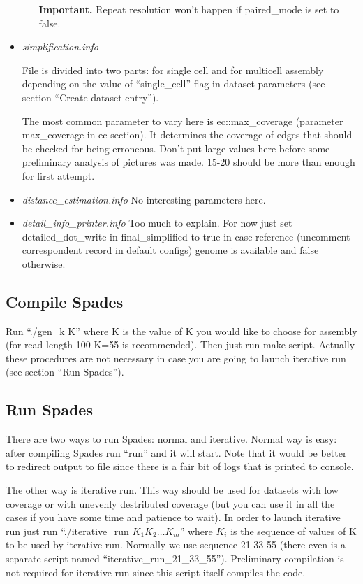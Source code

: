 \documentclass[a4paper,10pt]{article}
\begin{document}
\begin{itemize}
\begin{itemize}
\textbf{Important.} Repeat resolution won't happen if paired\_mode is set to false.
\end{itemize}

\item {\it simplification.info}

File is divided into two parts: for single cell and for multicell assembly depending on the value of ``single\_cell'' flag in dataset parameters (see section ``Create dataset entry'').

The most common parameter to vary here is ec::max\_coverage (parameter max\_coverage in ec section). It determines the coverage of edges that should be checked for being erroneous. Don't put large values here before some preliminary analysis of pictures was made. 15-20 should be more than enough for first attempt.

\item {\it distance\_estimation.info}
No interesting parameters here.

\item {\it detail\_info\_printer.info}
Too much to explain. For now just set detailed\_dot\_write in final\_simplified to true in case reference (uncomment correspondent record in default configs) genome is available and false otherwise.
\end{itemize}


\subsection{Compile Spades}
Run ``./gen\_k K'' where K is the value of K you would like to choose for assembly (for read length 100 K=55 is recommended).
Then just run make script.
Actually these procedures are not necessary in case you are going to launch iterative run (see section ``Run Spades'').

\subsection{Run Spades}
There are two ways to run Spades: normal and iterative. Normal way is easy: after compiling Spades run ``run'' and it will start. 
Note that it would be better to redirect output to file since there is a fair bit of logs that is printed to console.

The other way is iterative run.
This way should be used for datasets with low coverage or with unevenly destributed coverage 
(but you can use it in all the cases if you have some time and patience to wait). 
In order to launch iterative run just run ``./iterative\_run $K_1 K_2 \dots K_m$'' where $K_i$ is the sequence of values of K to be used by iterative run.
Normally we use sequence 21 33 55 (there even is a separate script named ``iterative\_run\_21\_33\_55'').
Preliminary compilation is not required for iterative run since this script itself compiles the code.
\end{document}
